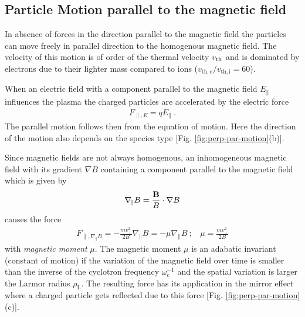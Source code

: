 \newpage

\subsection{Particle Motion parallel to the magnetic field}
\label{sub:parallelmotion}

In absence of forces in the direction parallel to the magnetic field the particles can move freely in parallel direction to the homogenous magnetic field. The velocity of this motion is of order of the thermal velocity $v_{\mathrm{th}}$ and is dominated by electrons due to their lighter mass compared to ions ($v_\mathrm{th,e}/v_\mathrm{th,i} = 60$). 

When an electric field with a component parallel to the magnetic field $E_\parallel$ influences the plasma the charged particles are accelerated by the electric force
\begin{gather}
    F_{\parallel,E} = qE_\parallel~.
\end{gather}
The parallel motion follows then from the equation of motion. Here the direction of the motion also depends on the species type [Fig. \ref{fig:perp-par-motion}(b)].\\\bigskip

Since magnetic fields are not always homogenous, an inhomogeneous magnetic field with its gradient $\nabla B$ containing a component parallel to the magnetic field which is given by
\begin{gather}
    \nabla_{\!\parallel} B = \frac{\boldsymbol{\mathbf{B}}}{B} \cdot \nabla B 
\end{gather}
causes the force
\begin{gather}
    F_{\parallel,\nabla_{\!\parallel} B} = - \frac{mv^2_{\perp}}{2B} \nabla_{\!\parallel} B = - \mu \nabla_{\!\parallel} B~;~~~~\mu = \frac{mv^2_{\perp}}{2B}
\end{gather}
with \textit{magnetic moment} $\mu$. The magnetic moment $\mu$ is an adabatic invariant (constant of motion) if the variation of the magnetic field over time is smaller than the inverse of the cyclotron frequency $\omega^{-1}_\mathrm{c}$ and the spatial variation is larger the Larmor radius $\rho_\mathrm{L}$. The resulting force has its application in the mirror effect where a charged particle gets reflected due to this force [Fig. \ref{fig:perp-par-motion}(c)]. \cite{Wesson2011}

\newpage

